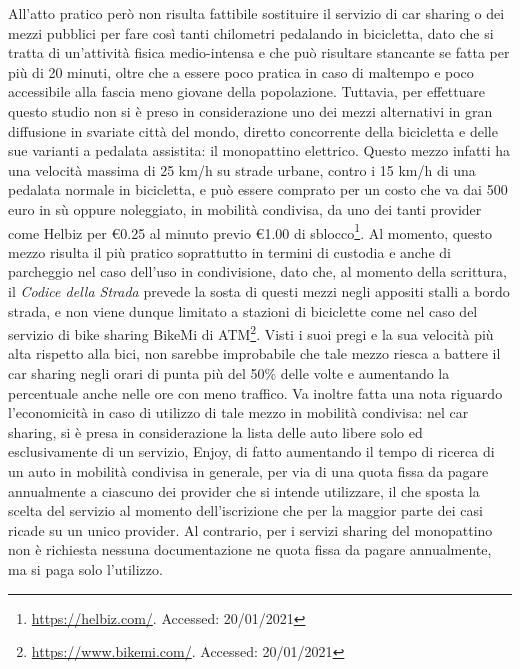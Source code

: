 All'atto pratico però non risulta fattibile sostituire il servizio di car sharing o dei mezzi pubblici per fare così tanti chilometri pedalando in bicicletta, dato che si tratta di un'attività fisica medio-intensa e che può risultare stancante se fatta per più di 20 minuti, oltre che a essere poco pratica in caso di maltempo e poco accessibile alla fascia meno giovane della popolazione. Tuttavia, per effettuare questo studio non si è preso in considerazione uno dei mezzi alternativi in gran diffusione in svariate città del mondo, diretto concorrente della bicicletta e delle sue varianti a pedalata assistita: il monopattino elettrico. Questo mezzo infatti ha una velocità massima di 25 km/h su strade urbane, contro i 15 km/h di una pedalata normale in bicicletta, e può essere comprato per un costo che va dai 500 euro in sù oppure noleggiato, in mobilità condivisa, da uno dei tanti provider come Helbiz per €0.25 al minuto previo €1.00 di sblocco\footnote{\url{https://helbiz.com/}. Accessed: 20/01/2021}. Al momento, questo mezzo risulta il più pratico soprattutto in termini di custodia e anche di parcheggio nel caso dell'uso in condivisione, dato che, al momento della scrittura, il \textit{Codice della Strada} prevede la sosta di questi mezzi negli appositi stalli a bordo strada, e non viene dunque limitato a stazioni di biciclette come nel caso del servizio di bike sharing BikeMi di ATM\footnote{\url{https://www.bikemi.com/}. Accessed: 20/01/2021}. Visti i suoi pregi e la sua velocità più alta rispetto alla bici, non sarebbe improbabile che tale mezzo riesca a battere il car sharing negli orari di punta più del 50\% delle volte e aumentando la percentuale anche nelle ore con meno traffico. Va inoltre fatta una nota riguardo l'economicità in caso di utilizzo di tale mezzo in mobilità condivisa: nel car sharing, si è presa in considerazione la lista delle auto libere solo ed esclusivamente di un servizio, Enjoy, di fatto aumentando il tempo di ricerca di un auto in mobilità condivisa in generale, per via di una quota fissa da pagare annualmente a ciascuno dei provider che si intende utilizzare, il che sposta la scelta del servizio al momento dell'iscrizione che per la maggior parte dei casi ricade su un unico provider. Al contrario, per i servizi sharing del monopattino non è richiesta nessuna documentazione ne quota fissa da pagare annualmente, ma si paga solo l'utilizzo.

